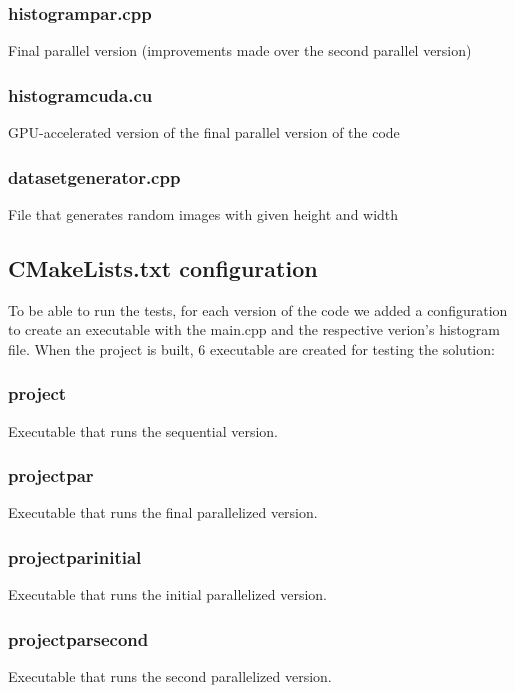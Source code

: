 \documentclass[sigconf]{acmart}
\begin{document}
\subsubsection{histogram\textunderscore par.cpp}
Final parallel version (improvements made over the second parallel version)

\subsubsection{histogram\textunderscore cuda.cu}
GPU-accelerated version of the final parallel version of the code

\subsubsection{dataset\textunderscore generator.cpp}
File that generates random images with given height and width

\subsection{CMakeLists.txt configuration}
To be able to run the tests, for each version of the code we added a configuration to create an executable with the main.cpp and the respective verion's histogram file. When the project is built, 6 executable are created for testing the solution:

\subsubsection{project}
Executable that runs the sequential version.

\subsubsection{project\textunderscore par}
Executable that runs the final parallelized version.

\subsubsection{project\textunderscore par\textunderscore initial}
Executable that runs the initial parallelized version.

\subsubsection{project\textunderscore par\textunderscore second}
Executable that runs the second parallelized version.
\end{document}
